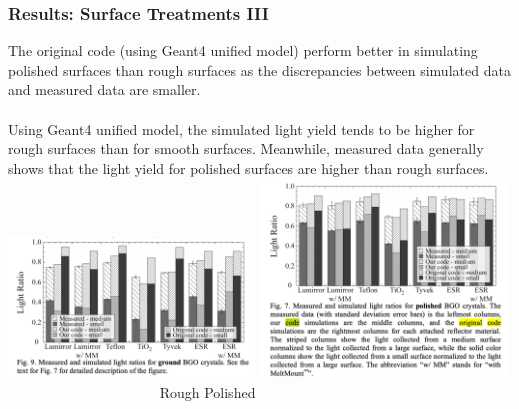 \documentclass[xcolor=x11names, compress, handout]{beamer}
\renewcommand{\(}{\begin{columns}}
\renewcommand{\)}{\end{columns}}
\newcommand{\<}[1]{\begin{column}{#1}}
\renewcommand{\>}{\end{column}}
\begin{document}
\begin{frame}
\frametitle{Results: Surface Treatments III}
\scriptsize
The original code (using Geant4 unified model) perform better in simulating polished surfaces than rough surfaces as the discrepancies between simulated data and measured data are smaller. \\
\ \\
Using Geant4 unified model, the simulated light yield tends to be higher for rough surfaces than for smooth surfaces. Meanwhile, measured data generally shows that the light yield for polished surfaces are higher than rough surfaces. 
\ \\
\centering
\includegraphics[width=0.49\textwidth, height=0.45\textheight]{images/bgo_rough.png}
\includegraphics[width=0.49\textwidth, height=0.6\textheight]{images/bgo_polished.png}
\flushleft~~~~~~~~~~~~~~~~~~~~~ Rough \hspace{5cm} Polished
\end{frame}
\end{document}

